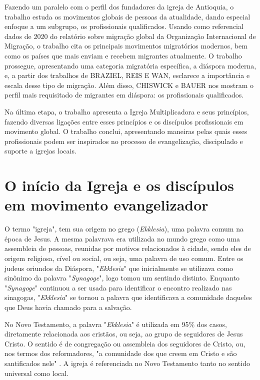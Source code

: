 \documentclass[12pt,openright,oneside,a4paper]{abntex2}
\begin{document}
Fazendo um paralelo com o perfil dos fundadores da igreja de Antioquia, o trabalho estuda os movimentos globais de pessoas da atualidade, dando especial enfoque a um subgrupo, os profissionais qualificados. Usando como referencial dados de 2020 do relatório sobre migração global da Organização Internacional de Migração, o trabalho cita os principais movimentos migratórios modernos, bem como os países que mais enviam e recebem migrantes atualmente. O trabalho prossegue, apresentando uma categoria migratória específica, a diáspora moderna, e, a partir dos trabalhos de BRAZIEL, REIS E WAN, esclarece a importância e escala desse tipo de migração. Além disso, CHISWICK e BAUER nos mostram o perfil mais requisitado de migrantes em diáspora: os profissionais qualificados. 

Na última etapa, o trabalho apresenta a Igreja Multiplicadora e seus princípios, fazendo diversas ligações entre esses princípios e os discípulos profissionais em movimento global. O trabalho conclui, apresentando maneiras pelas quais esses profissionais podem ser inspirados no processo de evangelização, discipulado e suporte a igrejas locais.


\chapter{O início da Igreja e os discípulos em movimento evangelizador}

O termo "igreja", tem sua origem no grego (\textit{Ekklesia}), uma palavra comum na época de Jesus. A mesma palavrava era utilizada no mundo grego como uma assembleia de pessoas, reunidas por motivos relacionados à cidade, sendo eles de origem religiosa, cível ou social, ou seja, uma palavra de uso comum\cite[p. 317]{zac}. Entre os judeus oriundos da Diáspora, "\textit{Ekklesia}" que inicialmente se utilizava como sinônimo da palavra "\textit{Synagoge}", logo tomou um sentindo distinto. Enquanto "\textit{Synagoge}" continuou a ser usada para identificar o encontro realizado nas sinagogas, "\textit{Ekklesia}" se tornou a palavra que identificava a comunidade daqueles que Deus havia chamado para a salvação\cite[p. 485]{bavinck}. 

No Novo Testamento, a palavra "\textit{Ekklesia}" é utilizada em 95\% dos casos, diretamente relacionada aos cristãos, ou seja, ao grupo de seguidores de Jesus Cristo. O sentido é de congregação ou assembleia dos seguidores de Cristo, ou, nos termos dos reformadores, "a comunidade dos que creem em Cristo e são santificados nele" \cite[p. 318]{zac}. A igreja é referenciada no Novo Testamento tanto no sentido universal como local\cite[p. 318]{zac}.
\end{document}

